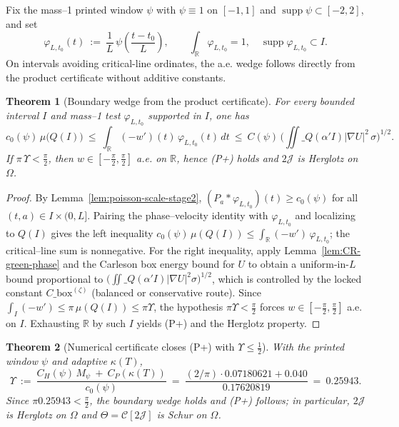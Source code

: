 \documentclass[11pt]{article}
\providecommand{\Mpsilocked}{0.07180621}%
\providecommand{\UpsilonLocked}{0.25943}%
\newtheorem{theorem}{Theorem}
\theoremstyle{definition}
\theoremstyle{remark}
\newcommand{\R}{\mathbb{R}}
\newcommand{\Poisson}{P}
\begin{document}
Fix the mass--1 printed window $\psi$ with $\psi\equiv 1$ on $[-1,1]$ and $\operatorname{supp}\psi\subset[-2,2]$, and set
\[
  \varphi_{L,t_0}(t)\ :=\ \frac{1}{L}\,\psi\!\left(\frac{t-t_0}{L}\right),\qquad \int_{\R}\!\varphi_{L,t_0}=1,\quad \operatorname{supp}\varphi_{L,t_0}\subset I.
\]
On intervals avoiding critical-line ordinates, the a.e. wedge follows directly from the product certificate without additive constants.
\begin{theorem}[Boundary wedge from the product certificate]\label{thm:psc-certificate-stage2}
For every bounded interval $I$ and mass--1 test $\varphi_{L,t_0}$ supported in $I$, one has
\[
  c_0(\psi)\,\mu\!\big(Q(I)\big)\ \le\ \int_{\R} (-w')(t)\,\varphi_{L,t_0}(t)\,dt\ \le\ C(\psi)\,\Big(\iint\_{Q(\alpha'I)} |\nabla U|^2\,\sigma\Big)^{1/2}.
\]
If $\pi\,\Upsilon<\tfrac{\pi}{2}$, then $w\in[-\tfrac{\pi}{2},\tfrac{\pi}{2}]$ a.e. on $\R$, hence \emph{(P+)} holds and $2\mathcal J$ is Herglotz on $\Omega$.
\end{theorem}
\begin{proof}
By Lemma~\ref{lem:poisson-scale-stage2}, $(\Poisson_a*\varphi_{L,t_0})(t)\ge c_0(\psi)$ for all $(t,a)\in I\times(0,L]$. Pairing the phase--velocity identity with $\varphi_{L,t_0}$ and localizing to $Q(I)$ gives the left inequality $c_0(\psi)\,\mu(Q(I))\le \int_{\R}(-w')\,\varphi_{L,t_0}$; the critical--line sum is nonnegative. For the right inequality, apply Lemma~\ref{lem:CR-green-phase} and the Carleson box energy bound for $U$ to obtain a uniform-in-$L$ bound proportional to $\big(\iint\_{Q(\alpha'I)} |\nabla U|^2\sigma\big)^{1/2}$, which is controlled by the locked constant $C\_{\mathrm{box}}^{(\zeta)}$ (balanced or conservative route).
Since $\int_I(-w')\le \pi\,\mu(Q(I))\le \pi\Upsilon$, the hypothesis $\pi\Upsilon<\tfrac{\pi}{2}$ forces $w\in[-\tfrac\pi2,\tfrac\pi2]$ a.e. on $I$. Exhausting $\R$ by such $I$ yields (P+) and the Herglotz property.
\end{proof}
\begin{theorem}[Numerical certificate closes (P+) with $\Upsilon\le \tfrac12$]\label{thm:numeric-close-stage2}
With the printed window $\psi$ and adaptive $\kappa(T)$,
\[ \Upsilon\ :=\ \frac{C_H(\psi)\,M_\psi\ +\ C_P(\kappa(T))}{c_0(\psi)}\ =\ \frac{(2/\pi)\cdot \Mpsilocked + 0.040}{0.17620819}\ =\ \UpsilonLocked.\]
Since $\pi\UpsilonLocked<\tfrac{\pi}{2}$, the boundary wedge holds and \textup{(P+)} follows; in particular, $2\mathcal J$ is Herglotz on $\Omega$ and $\Theta=\mathcal C[2\mathcal J]$ is Schur on $\Omega$.
\end{theorem}
\end{document}
